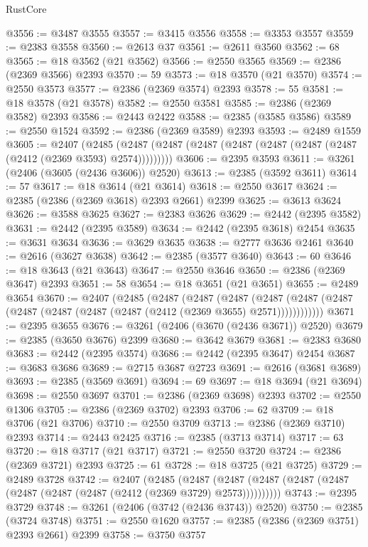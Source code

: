 \begin{lexlean}{RustCore}
\begin{coremodule}
@3556 := @3487 @3555
@3557 := @3415 @3556
@3558 := @3353 @3557
@3559 := @2383 @3558
@3560 := @2613 @37
@3561 := @2611 @3560
@3562 := 68
@3565 := @18 @3562 (@21 @3562)
@3566 := @2550 @3565
@3569 := @2386 (@2369 @3566) @2393
@3570 := 59
@3573 := @18 @3570 (@21 @3570)
@3574 := @2550 @3573
@3577 := @2386 (@2369 @3574) @2393
@3578 := 55
@3581 := @18 @3578 (@21 @3578)
@3582 := @2550 @3581
@3585 := @2386 (@2369 @3582) @2393
@3586 := @2443 @2422
@3588 := @2385 (@3585 @3586)
@3589 := @2550 @1524
@3592 := @2386 (@2369 @3589) @2393
@3593 := @2489 @1559
@3605 := @2407
    (@2485 (@2487 (@2487 (@2487 (@2487 (@2487 (@2487 (@2487 (@2412 (@2369 @3593) @2574)))))))))
@3606 := @2395 @3593
@3611 := @3261 (@2406 (@3605 (@2436 @3606)) @2520)
@3613 := @2385 (@3592 @3611)
@3614 := 57
@3617 := @18 @3614 (@21 @3614)
@3618 := @2550 @3617
@3624 := @2385 (@2386 (@2369 @3618) @2393 @2661) @2399
@3625 := @3613 @3624
@3626 := @3588 @3625
@3627 := @2383 @3626
@3629 := @2442 (@2395 @3582)
@3631 := @2442 (@2395 @3589)
@3634 := @2442 (@2395 @3618) @2454
@3635 := @3631 @3634
@3636 := @3629 @3635
@3638 := @2777 @3636 @2461
@3640 := @2616 (@3627 @3638)
@3642 := @2385 (@3577 @3640)
@3643 := 60
@3646 := @18 @3643 (@21 @3643)
@3647 := @2550 @3646
@3650 := @2386 (@2369 @3647) @2393
@3651 := 58
@3654 := @18 @3651 (@21 @3651)
@3655 := @2489 @3654
@3670 := @2407
    (@2485
      (@2487
        (@2487
          (@2487
            (@2487 (@2487 (@2487 (@2487 (@2487 (@2487 (@2487 (@2412 (@2369 @3655) @2571))))))))))))
@3671 := @2395 @3655
@3676 := @3261 (@2406 (@3670 (@2436 @3671)) @2520)
@3679 := @2385 (@3650 @3676) @2399
@3680 := @3642 @3679
@3681 := @2383 @3680
@3683 := @2442 (@2395 @3574)
@3686 := @2442 (@2395 @3647) @2454
@3687 := @3683 @3686
@3689 := @2715 @3687 @2723
@3691 := @2616 (@3681 @3689)
@3693 := @2385 (@3569 @3691)
@3694 := 69
@3697 := @18 @3694 (@21 @3694)
@3698 := @2550 @3697
@3701 := @2386 (@2369 @3698) @2393
@3702 := @2550 @1306
@3705 := @2386 (@2369 @3702) @2393
@3706 := 62
@3709 := @18 @3706 (@21 @3706)
@3710 := @2550 @3709
@3713 := @2386 (@2369 @3710) @2393
@3714 := @2443 @2425
@3716 := @2385 (@3713 @3714)
@3717 := 63
@3720 := @18 @3717 (@21 @3717)
@3721 := @2550 @3720
@3724 := @2386 (@2369 @3721) @2393
@3725 := 61
@3728 := @18 @3725 (@21 @3725)
@3729 := @2489 @3728
@3742 := @2407
    (@2485
      (@2487 (@2487 (@2487 (@2487 (@2487 (@2487 (@2487 (@2487 (@2412 (@2369 @3729) @2573))))))))))
@3743 := @2395 @3729
@3748 := @3261 (@2406 (@3742 (@2436 @3743)) @2520)
@3750 := @2385 (@3724 @3748)
@3751 := @2550 @1620
@3757 := @2385 (@2386 (@2369 @3751) @2393 @2661) @2399
@3758 := @3750 @3757

\end{coremodule}
\end{lexlean}
